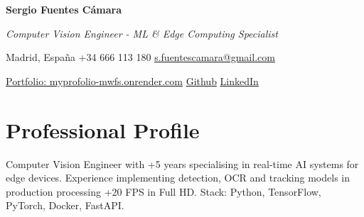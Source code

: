 \documentclass[11pt]{article}
\begin{document}
\begin{center}
    {\color{headercolor}\Huge\textbf{ Sergio Fuentes Cámara }}

    \vspace{0.3cm}
    {\large\textit{ Computer Vision Engineer - ML & Edge Computing Specialist }}

    \vspace{0.15cm}
    \noindent\makebox[\linewidth]{\color{accentcolor}\rule{0.8\paperwidth}{0.5pt}}

    \vspace{0.15cm}
    Madrid, España \quad +34 666 113 180 \quad \href{mailto:s.fuentescamara@gmail.com}{s.fuentescamara@gmail.com}

    \href{https://myprofolio-mwfs.onrender.com}{Portfolio: myprofolio-mwfs.onrender.com} \quad \href{https://github.com/sfuentescamara}{Github} \quad \href{https://linkedin.com/in/sergiofuentescamara}{LinkedIn}

    \noindent\makebox[\linewidth]{\color{accentcolor}\rule{0.8\paperwidth}{0.5pt}}
\end{center}

\section*{Professional Profile}
\noindent Computer Vision Engineer with +5 years specialising in real-time AI systems for edge devices. Experience implementing detection, OCR and tracking models in production processing +20 FPS in Full HD. Stack: Python, TensorFlow, PyTorch, Docker, FastAPI.

\vspace{0.05cm}

\end{document}
